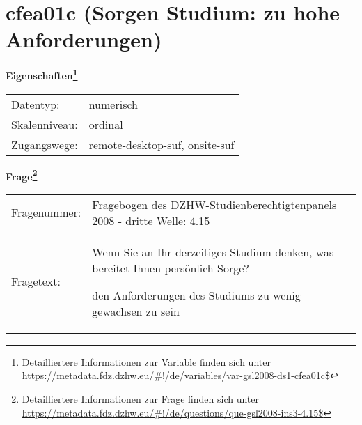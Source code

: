 
    \setcounter{footnote}{0}

    \vspace*{-1.8cm}
	\section{cfea01c (Sorgen Studium: zu hohe Anforderungen)}
	\label{section:cfea01c}



    \vspace*{0.5cm}
    \noindent\textbf{Eigenschaften\footnote{Detailliertere Informationen zur Variable finden sich unter
		\url{https://metadata.fdz.dzhw.eu/\#!/de/variables/var-gsl2008-ds1-cfea01c$}}}\\
	\begin{tabularx}{\hsize}{@{}lX}
	Datentyp: & numerisch \\
	Skalenniveau: & ordinal \\
	Zugangswege: &
	  remote-desktop-suf, 
	  onsite-suf
 \\
    \end{tabularx}



				\vspace*{0.5cm}
                \noindent\textbf{Frage\footnote{Detailliertere Informationen zur Frage finden sich unter
		              \url{https://metadata.fdz.dzhw.eu/\#!/de/questions/que-gsl2008-ins3-4.15$}}}\\
				\begin{tabularx}{\hsize}{@{}lX}
					Fragenummer: &
					  Fragebogen des DZHW-Studienberechtigtenpanels 2008 - dritte Welle:
					  4.15
 \\
					Fragetext: & Wenn Sie an Ihr derzeitiges Studium denken, was bereitet Ihnen persönlich Sorge?\par  den Anforderungen des Studiums zu wenig gewachsen zu sein \\
				\end{tabularx}





